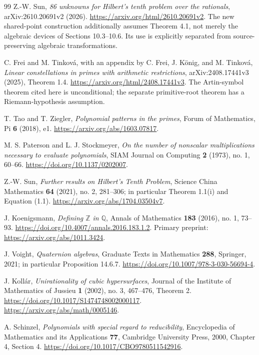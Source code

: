 \documentclass[11pt]{article}
\theoremstyle{definition}
\newcommand{\Q}{\mathbb Q}
\newcommand{\Z}{\mathbb Z}
\begin{document}
\begin{thebibliography}{99}
Z.-W. Sun, \emph{86 unknowns for Hilbert's tenth problem over the
rationals}, arXiv:2610.20691v2 (2026).
\url{https://arxiv.org/html/2610.20691v2}.
The new shared-point construction additionally assumes Theorem 4.1,
not merely the algebraic devices of Sections 10.3--10.6. Its use is
explicitly separated from source-preserving algebraic transformations.

C. Frei and M. Tinkov\'a, with an appendix by C. Frei, J. K\"onig,
and M. Tinkov\'a, \emph{Linear constellations in primes with arithmetic
restrictions}, arXiv:2408.17441v3 (2025), Theorem 1.4.
\url{https://arxiv.org/html/2408.17441v3}.
The Artin-symbol theorem cited here is unconditional; the separate
primitive-root theorem has a Riemann-hypothesis assumption.

T. Tao and T. Ziegler, \emph{Polynomial patterns in the primes},
Forum of Mathematics, Pi \textbf{6} (2018), e1.
\url{https://arxiv.org/abs/1603.07817}.

M. S. Paterson and L. J. Stockmeyer, \emph{On the number of nonscalar
multiplications necessary to evaluate polynomials}, SIAM Journal on
Computing \textbf{2} (1973), no. 1, 60--66.
\url{https://doi.org/10.1137/0202007}.

Z.-W. Sun, \emph{Further results on Hilbert's Tenth Problem},
Science China Mathematics \textbf{64} (2021), no. 2, 281--306;
in particular Theorem 1.1(i) and Equation (1.1).
\url{https://arxiv.org/abs/1704.03504v7}.

J. Koenigsmann, \emph{Defining $\Z$ in $\Q$}, Annals of Mathematics
\textbf{183} (2016), no. 1, 73--93.
\url{https://doi.org/10.4007/annals.2016.183.1.2}.
Primary preprint: \url{https://arxiv.org/abs/1011.3424}.

J. Voight, \emph{Quaternion algebras}, Graduate Texts in Mathematics
\textbf{288}, Springer, 2021; in particular Proposition 14.6.7.
\url{https://doi.org/10.1007/978-3-030-56694-4}.

J. Koll\'ar, \emph{Unirationality of cubic hypersurfaces}, Journal
of the Institute of Mathematics of Jussieu \textbf{1} (2002), no. 3,
467--476, Theorem 2.
\url{https://doi.org/10.1017/S1474748002000117}.
\url{https://arxiv.org/abs/math/0005146}.

A. Schinzel, \emph{Polynomials with special regard to reducibility},
Encyclopedia of Mathematics and its Applications \textbf{77},
Cambridge University Press, 2000, Chapter 4, Section 4.
\url{https://doi.org/10.1017/CBO9780511542916}.


\end{thebibliography}
\end{document}
